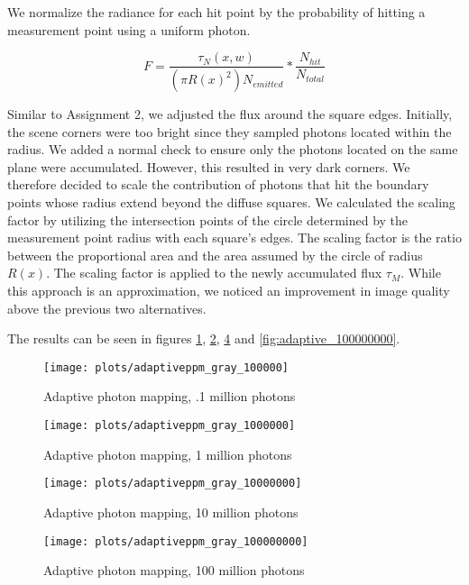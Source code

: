 We normalize the radiance for each hit point by the probability of hitting a measurement point using a uniform photon.

$$ F = \frac{\tau_{N}(x, w)}{(\pi R(x)^2) N_{emitted}}*\frac{N_{hit}}{N_{total}} $$

Similar to Assignment 2, we adjusted the flux around the square edges. Initially, the scene corners were too bright since they sampled photons located within the radius. We added a normal check to ensure only the photons located on the same plane were accumulated. However, this resulted in very dark corners. We therefore decided to scale the contribution of photons that hit the boundary points whose radius extend beyond the diffuse squares. We calculated the scaling factor by utilizing the intersection points of the circle determined by the measurement point radius with each square's edges. The scaling factor is the ratio between the proportional area and the area assumed by the circle of radius $R(x)$. The scaling factor is applied to the newly accumulated flux $\tau_M$. While this approach is an approximation, we noticed an improvement in image quality above the previous two alternatives.

The results can be seen in figures \ref{fig:adaptive_100000}, \ref{fig:adaptive_1000000}, \ref{fig:adaptive_10000000} and \ref{fig:adaptive_100000000}.

\begin{figure}[H]
    \centering
    \texttt{[image: plots/adaptiveppm\_gray\_100000]}\\
    \caption{Adaptive photon mapping, .1 million photons}
    \label{fig:adaptive_100000}
\end{figure}

\begin{figure}[H]
    \centering
    \texttt{[image: plots/adaptiveppm\_gray\_1000000]}\\
    \caption{Adaptive photon mapping, 1 million photons}
    \label{fig:adaptive_1000000}
\end{figure}

\begin{figure}[H]
    \centering
    \texttt{[image: plots/adaptiveppm\_gray\_10000000]}\\
    \caption{Adaptive photon mapping, 10 million photons}
    \label{fig:adaptive_10000000}
\end{figure}

\begin{figure}[H]
    \centering
    \texttt{[image: plots/adaptiveppm\_gray\_100000000]}\\
    \caption{Adaptive photon mapping, 100 million photons}
    \label{fig:adaptive_10000000}
\end{figure}
\pagebreak

